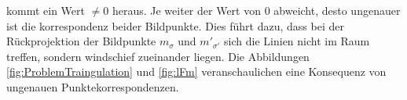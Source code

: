 kommt ein Wert $\neq 0$ heraus. Je weiter der Wert von 0 abweicht, desto ungenauer ist die korrespondenz beider Bildpunkte. Dies führt dazu, dass bei der Rückprojektion der Bildpunkte $m_\sigma$ und $m'_{\sigma'}$ sich die Linien nicht im Raum treffen, sondern windschief zueinander liegen. Die Abbildungen \ref{fig:ProblemTraingulation} und \ref{fig:lFm} veranschaulichen eine Konsequenz von ungenauen Punktekorrespondenzen.
%
%
%
%


